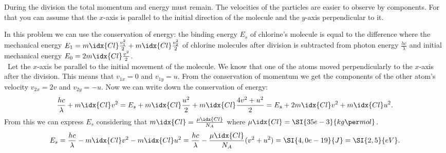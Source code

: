 {\ifEngHint
During the division the total momentum and energy must remain. The velocities of the particles are easier to observe by components. For that you can assume that the $x$-axis is parallel to the initial direction of the molecule and the $y$-axis perpendicular to it.
\fi


\ifEngSolution
In this problem we can use the conservation of energy: the binding energy $E_s$ of chlorine’s molecule is equal to the difference where the mechanical energy $E_1 = m\idx{Cl} \frac{v_1^2}{2} + m\idx{Cl} \frac{v_2^2}{2}$ of chlorine molecules after division is subtracted from photon energy $\frac{hc}{\lambda}$ and initial mechanical energy $E_0 = 2m\idx{Cl} \frac{v^2}{2} $.\\\    
Let the $x$-axis be parallel to the initial movement of the molecule. We know that one of the atoms moved perpendicularly to the $x$-axis after the division. This means that $v_{1x} = 0$ and $v_{1y} = u$. From the conservation of momentum we get the components of the other atom’s velocity $v_{2x} = 2 v$ and $v_{2y} = -u$. Now we can write down the conservation of energy:
$$
	\frac{hc}{\lambda} + m\idx{Cl} v^2  = E_s + m\idx{Cl} \frac{u^2}{2} + m\idx{Cl} \frac{4v^2 + u^2}{2} = E_s + 2 m\idx{Cl} v^2 + m\idx{Cl} u^2.
$$ 
From this we can express $E_s$ considering that $m\idx{Cl} = \frac{\mu\idx{Cl}}{N_A}$ where $\mu\idx{Cl} = \SI{35e-3}{kg\per mol}$.
$$ E_s = \frac{hc}{\lambda} - m\idx{Cl} v^2 - m\idx{Cl} u^2 = \frac{hc}{\lambda} - \frac{\mu\idx{Cl}}{N_A} (v^2 + u^2) = \SI{4,0e-19}{J} = \SI{2,5}{eV}.
$$
\fi
}